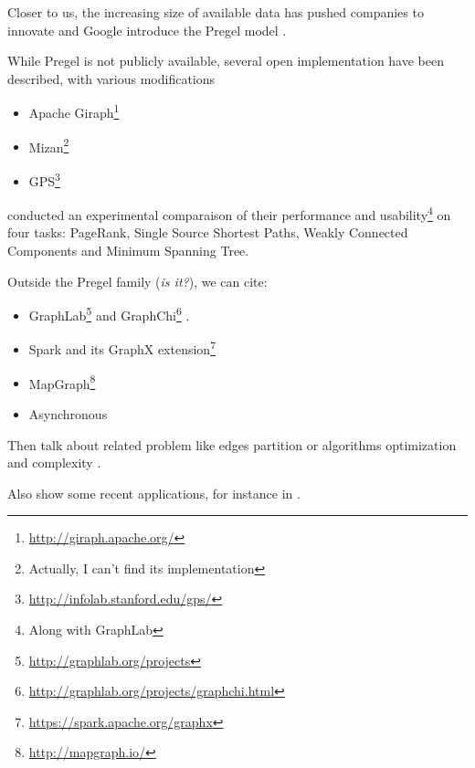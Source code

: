 Closer to us, the increasing size of available data has pushed companies to
innovate and Google introduce the Pregel model \autocite{Pregel10}.

While Pregel is not publicly available, several open implementation have been
described, with various modifications

\begin{itemize}
	\item Apache
		Giraph\footnote{\href{http://giraph.apache.org/}{http://giraph.apache.org/}}
	\item Mizan\footnote{Actually, I can't find its implementation} \autocite{Khayyat2013}
	\item
		GPS\footnote{\href{http://infolab.stanford.edu/gps/}{http://infolab.stanford.edu/gps/}}
		\autocite{Salihoglu2013}
\end{itemize}

\Textcite{Han2014} conducted an experimental comparaison of their performance and
usability\footnote{Along with GraphLab} on four tasks: PageRank, Single Source
Shortest Paths, Weakly Connected Components and Minimum Spanning Tree.

Outside the Pregel family (\emph{is it?}), we can cite:

\begin{itemize}
	\item
		GraphLab\footnote{\href{http://graphlab.org/projects/source.html}{http://graphlab.org/projects}}%
		\autocites{Low2010}{Gonzalez2012}{Low2012} and
		GraphChi\footnote{\href{http://graphlab.org/projects/graphchi.html}{http://graphlab.org/projects/graphchi.html}}
		\autocite{Kyrola2012}.
	\item
		Spark \autocite{Zaharia2010} and its GraphX
		extension\footnote{\href{https://spark.apache.org/graphx}{https://spark.apache.org/graphx}}
	\item MapGraph\footnote{\href{http://mapgraph.io/}{http://mapgraph.io/}}
		\autocite{Fu2014}
		\item Asynchronous \autocite{Wang2013}
\end{itemize}

Then talk about related problem like edges partition \autocite{Bourse2014a} or
algorithms optimization \autocites{Salihoglu14}{Salihoglu2014b} and complexity \autocite{Klauck2013}.

Also show some recent applications, for instance in \pcc{}
\autocites{Bonchi2012}{Chierichetti2014}.
\autocite{Quick2012}

